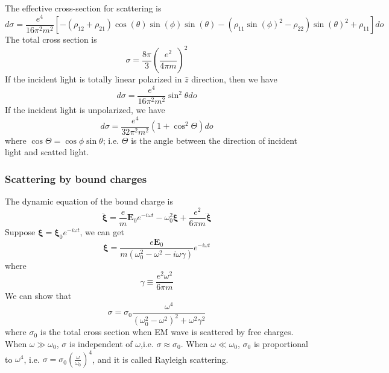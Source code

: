 The effective cross-section for scattering is
\[d\sigma = \frac{e^4}{16\pi^2 m^2}[-(\rho_{12}+\rho_{21})\cos\left({\theta}\right)\sin\left({\phi}\right)
\sin\left({\theta}\right) - {\left(\rho_{11} \sin\left({\phi}\right)^{2}
- \rho_{22}\right)} \sin\left({\theta}\right)^{2} + \rho_{11} ]do\]
The total cross section is
\[\sigma = \frac{8\pi}{3} \left( \frac{e^2}{4\pi m} \right)^2\]
If the incident light is totally linear polarized in $\hat{z}$ direction, then we have
\[d\sigma = \frac{e^4}{16\pi^2 m^2} \sin^2\theta do\]
If the incident light is unpolarized, we have
\[d\sigma = \frac{e^4}{32\pi^2 m^2}\left(1 +  \cos^2\Theta \right)do\]
where $\cos\Theta = \cos\phi\sin\theta$; i.e. $\Theta$ is the angle between the direction of incident light and scatted light.

\subsubsection{Scattering by bound charges}
The dynamic equation of the bound charge is
\[\ddot{\bm{\xi}} = \frac{e}{m}\bm{E}_0e^{-i\omega t} - \omega_0^2 \bm{\xi} + \frac{e^2}{6\pi m} \dddot{\bm{\xi}}\]
Suppose $\bm{\xi} = \bm{\xi}_0 e^{-i\omega t}$, we can get
\[\bm{\xi} = \frac{e\bm{E}_0}{m(\omega_0^2 - \omega^2 - i\omega \gamma)} e^{-i\omega t}\]
where
\[\gamma \equiv \frac{e^2 \omega^2}{6\pi m}\]
We can show that
\[\sigma = \sigma_0 \frac{\omega^4}{(\omega_0^2-\omega^2)^2 + \omega^2 \gamma^2}\]
where $\sigma_0$ is the total cross section when EM wave is scattered by free charges. When $\omega \gg \omega_0$, $\sigma$ is independent of $\omega$,i.e. $\sigma \approx \sigma_0$. When $\omega \ll \omega_0$, $\sigma_0$ is proportional to $\omega^4$, i.e. $\sigma = \sigma_0 \left(\frac{\omega}{\omega_0}\right)^4$, and it is called Rayleigh scattering.